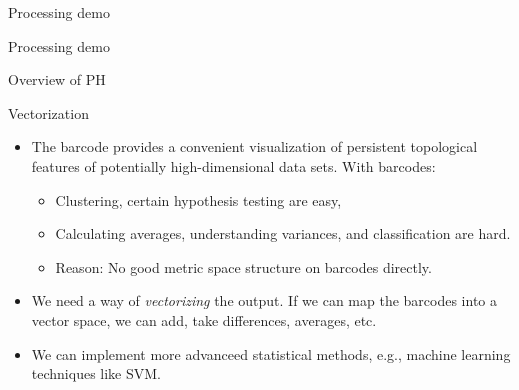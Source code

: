 \documentclass[usenames,dvipsnames,aspectratio=1610]{beamer}
\begin{document}
\begin{frame}{Processing demo}
  \begin{center} Processing demo \end{center}
  \end{frame}

\begin{frame}{Overview of PH}
\end{frame}

\begin{frame}{Vectorization}
  \begin{itemize}
    \item The barcode provides a convenient visualization of persistent topological
      features of potentially high-dimensional data sets. With barcodes:
      \begin{itemize}
	\item Clustering, certain hypothesis testing are {\color{blue} easy},
	\item Calculating averages, understanding variances, and classification are {\color{red}
	  hard}.
	\item {\color{green} Reason:} No good metric space structure on barcodes directly.
      \end{itemize}
    \item We need a way of {\em vectorizing} the output. If we can map the barcodes into
      a vector space, we can add, take differences, averages, etc. 
    \item We can implement more advanceed statistical methods, e.g., machine learning
      techniques like SVM.
  \end{itemize}
\end{frame}
\end{document}
